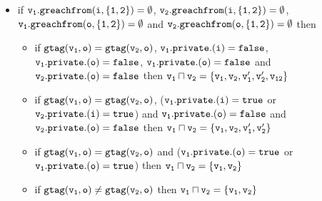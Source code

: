 \begin{itemize}
 
  \item if $\tt v_1.greachfrom(i,\{1,2\}) = \emptyset$, $\tt v_2.greachfrom(i,\{1,2\}) = \emptyset$, $\tt v_1.greachfrom(o,\{1,2\}) = \emptyset$ and $\tt v_2.greachfrom(o,\{1,2\}) = \emptyset$ then 
 \begin{itemize}
 
 
 \item if $\tt gtag(v_1, o) = gtag(v_2, o)$, $\tt v_1.private.(i) = false$, $\tt v_1.private.(o) = false$, $\tt v_1.private.(o) = false$ and $\tt v_2.private.(o) = false$ then  $\tt v_1 \sqcap v_2 = \{v_1,v_2,v_1',v_2',v_{12}\}$ %
    \item if $\tt gtag(v_1, o) = gtag(v_2, o)$, ($\tt v_1.private.(i) = true$ or $\tt v_2.private.(i) = true$) and $\tt v_1.private.(o) = false$ and $\tt v_2.private.(o) = false$ then  $\tt v_1 \sqcap v_2 = \{v_1,v_2,v_1',v_2'\}$  

  \item if $\tt gtag(v_1, o) = gtag(v_2, o)$ and ($\tt v_1.private.(o) = true$ or $\tt v_1.private.(o) = true$) then  $\tt v_1 \sqcap v_2 = \{v_1,v_2\}$ 

    \item if $\tt gtag(v_1, o) \neq gtag(v_2, o)$ then $\tt v_1 \sqcap v_2 = \{v_1,v_2\}$
 \end{itemize}
 
 \end{itemize}



